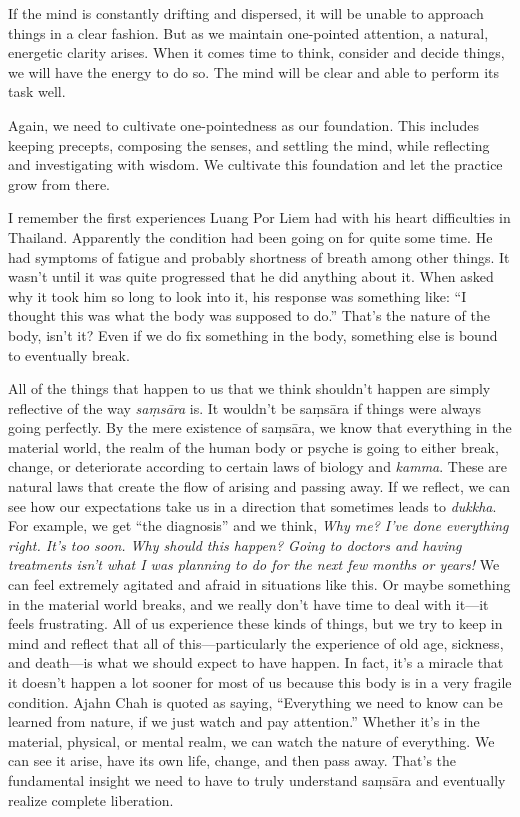 If the mind is constantly drifting and dispersed, it will be unable to 
approach things in a clear fashion. But as we maintain one-pointed 
attention, a natural, energetic clarity arises. When it comes time to 
think, consider and decide things, we will have the energy to do so. 
The mind will be clear and able to perform its task well.

Again, we need to cultivate one-pointedness as our foundation. This 
includes keeping precepts, composing the senses, and settling the mind, 
while reflecting and investigating with wisdom. We cultivate this 
foundation and let the practice grow from there.


I remember the first experiences Luang Por Liem had with his heart 
difficulties in Thailand. Apparently the condition had been going on 
for quite some time. He had symptoms of fatigue and probably shortness 
of breath among other things. It wasn't until it was quite progressed 
that he did anything about it. When asked why it took him so long to 
look into it, his response was something like: ``I thought this was 
what the body was supposed to do.'' That's the nature of the body, 
isn't it? Even if we do fix something in the body, something else is 
bound to eventually break.

All of the things that happen to us that we think shouldn't happen are 
simply reflective of the way \emph{saṃsāra} is. It wouldn't be 
saṃsāra if things were always going perfectly. By the mere existence 
of saṃsāra, we know that everything in the material world, the realm 
of the human body or psyche is going to either break, change, or 
deteriorate according to certain laws of biology and \emph{kamma}. 
These are natural laws that create the flow of arising and passing 
away. If we reflect, we can see how our expectations take us in a 
direction that sometimes leads to \emph{dukkha}. For example, we get 
``the diagnosis'' and we think, \emph{Why me? I've done everything 
right. It's too soon. Why should this happen? Going to doctors and 
having treatments isn't what I was planning to do for the next few 
months or years!} We can feel extremely agitated and afraid in 
situations like this. Or maybe something in the material world breaks, 
and we really don't have time to deal with it---it feels frustrating. 
All of us experience these kinds of things, but we try to keep in mind 
and reflect that all of this---particularly the experience of old age, 
sickness, and death---is what we should expect to have happen. In fact, 
it's a miracle that it doesn't happen a lot sooner for most of us 
because this body is in a very fragile condition. Ajahn Chah is quoted 
as saying, ``Everything we need to know can be learned from nature, if 
we just watch and pay attention.'' Whether it's in the material, 
physical, or mental realm, we can watch the nature of everything. We 
can see it arise, have its own life, change, and then pass away. That's 
the fundamental insight we need to have to truly understand saṃsāra 
and eventually realize complete liberation.

